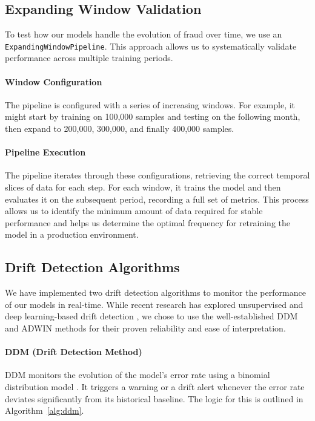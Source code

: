 \subsection{Expanding Window Validation}
\label{sec:4_8_2}

To test how our models handle the evolution of fraud over time, we use an \texttt{ExpandingWindowPipeline}. This approach allows us to systematically validate performance across multiple training periods.

\paragraph{Window Configuration}
The pipeline is configured with a series of increasing windows. For example, it might start by training on 100,000 samples and testing on the following month, then expand to 200,000, 300,000, and finally 400,000 samples.

\paragraph{Pipeline Execution}
The pipeline iterates through these configurations, retrieving the correct temporal slices of data for each step. For each window, it trains the model and then evaluates it on the subsequent period, recording a full set of metrics. This process allows us to identify the minimum amount of data required for stable performance and helps us determine the optimal frequency for retraining the model in a production environment.

\subsection{Drift Detection Algorithms}
\label{sec:4_8_3}

We have implemented two drift detection algorithms to monitor the performance of our models in real-time. While recent research has explored unsupervised and deep learning-based drift detection \cite{arora2024drift}, we chose to use the well-established DDM and ADWIN methods for their proven reliability and ease of interpretation.

\paragraph{DDM (Drift Detection Method)}
DDM monitors the evolution of the model's error rate using a binomial distribution model \cite{gama2004learning}. It triggers a warning or a drift alert whenever the error rate deviates significantly from its historical baseline. The logic for this is outlined in Algorithm~\ref{alg:ddm}.

